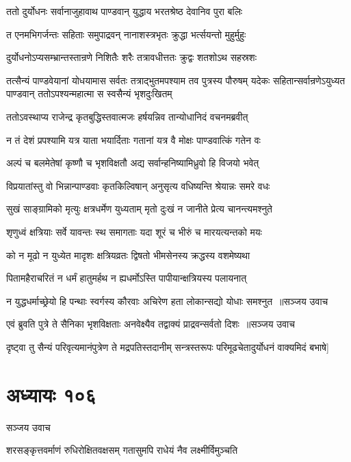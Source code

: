\twolineshloka
{ततो दुर्योधनः सर्वानाजुहावाथ पाण्डवान्}
{युद्धाय भरतश्रेष्ठ देवानिव पुरा बलिः}


\twolineshloka
{त एनमभिगर्जन्तः सहिताः समुपाद्रवन्}
{नानाशस्त्रभृतः क्रुद्धा भर्त्सयन्तो मुहुर्मुहुः}


\twolineshloka
{दुर्योधनोऽप्यसम्भ्रान्तस्तान्रणे निशितैः शरैः}
{तत्रावधीत्ततः क्रुद्वः शतशोऽथ सहस्रशः}


तत्सैन्यं पाण्डवेयानां योधयामास सर्वतः
\threelineshloka
{तत्राद्भुतमपश्याम तव पुत्रस्य पौरुषम्}
{यदेकः सहितान्सर्वान्रणेऽयुध्यत पाण्डवान्}
{ततोऽपश्यन्महात्मा स स्वसैन्यं भृशदुःखितम्}


\twolineshloka
{ततोऽवस्थाप्य राजेन्द्र कृतबुद्धिस्तवात्मजः}
{हर्षयन्निव तान्योधानिदं वचनमब्रवीत्}


\twolineshloka
{न तं देशं प्रपश्यामि यत्र याता भयार्दिताः}
{गतानां यत्र वै मोक्षः पाण्डवात्किं गतेन वः}


\twolineshloka
{अल्पं च बलमेतेषां कृष्णौ च भृशविक्षतौ}
{अद्य सर्वान्हनिष्यामिध्रुवो हि विजयो भवेत्}


\twolineshloka
{विप्रयातांस्तु वो भिन्नान्पाण्डवाः कृतकिल्विषान्}
{अनुसृत्य वधिष्यन्ति श्रेयान्नः समरे वधः}


\twolineshloka
{सुखं साङ्ग्रामिको मृत्युः क्षत्रधर्मेण युध्यताम्}
{मृतो दुःखं न जानीते प्रेत्य चानन्त्यमश्नुते}


\twolineshloka
{शृणुध्वं क्षत्रियाः सर्वे यावन्तः स्थ समागताः}
{यदा शूरं च भीरुं च मारयत्यन्तको मयः}


\twolineshloka
{को न मूढो न युध्येत मादृशः क्षत्रियव्रतः}
{द्विषतो भीमसेनस्य क्रद्धस्य वशमेष्यथा}


\twolineshloka
{पितामहैराचरितं न धर्मं हातुमर्हथ}
{न ह्यधर्मोऽस्ति पापीयान्क्षत्रियस्य पलायनात्}


\threelineshloka
{न युद्धधर्माच्छ्रेयो हि पन्थाः स्वर्गस्य कौरवाः}
{अचिरेण हता लोकान्सद्यो योधाः समश्नुत ॥सञ्जय उवाच}
{}


\threelineshloka
{एवं ब्रुवति पुत्रे ते सैनिका भृशविक्षताः}
{अनवेक्ष्यैव तद्वाक्यं प्राद्रवन्सर्वतो दिशः ॥सञ्जय उवाच}
{}


\twolineshloka
{दृष्ट्वा तु सैन्यं परिवृत्यमानंपुत्रेण ते मद्रपतिस्तदानीम्}
{सन्त्रस्तरूपः परिमूढचेतादुर्योधनं वाक्यमिदं बभाषे]}


\chapter{अध्यायः १०६}
\twolineshloka
{सञ्जय उवाच}
{}


\twolineshloka
{शरसङ्कृत्तवर्माणं रुधिरोक्षितवक्षसम्}
{गतासुमपि राधेयं नैव लक्ष्मीर्विमुञ्चति}


